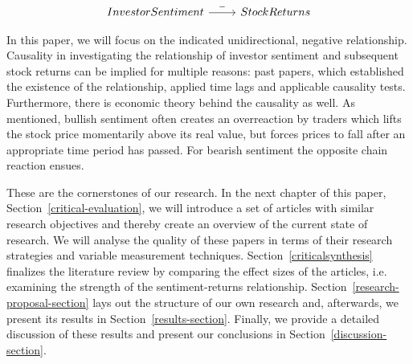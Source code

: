 \[
	\begin{tikzcd}
    Investor Sentiment \arrow{r}{-} & Stock Returns
	\end{tikzcd}
\]
\par 
In this paper, we will focus on the indicated unidirectional, negative relationship. Causality in investigating the relationship of investor sentiment and subsequent stock returns can be implied for multiple reasons: past papers, which established the existence of the relationship, applied time lags and applicable causality tests. Furthermore, there is economic theory behind the causality as well.  As mentioned, bullish sentiment often creates an overreaction by traders which lifts the stock price momentarily above its real value, but forces prices to fall after an appropriate time period has passed. For bearish sentiment the opposite chain reaction ensues.
\par
These are the cornerstones of our research. In the next chapter of this paper, Section~\ref{critical-evaluation},  we will introduce a set of articles with similar research objectives and thereby create an overview of the current state of research. We will analyse the quality of these papers in terms of their research strategies and variable measurement techniques. Section~\ref{criticalsynthesis} finalizes the literature review by comparing the effect sizes of the articles, i.e. examining the strength of the sentiment-returns relationship. Section~\ref{research-proposal-section} lays out the structure of our own research and, afterwards, we present its results in Section~\ref{results-section}. Finally, we provide a detailed discussion of these results and present our conclusions in Section~\ref{discussion-section}.